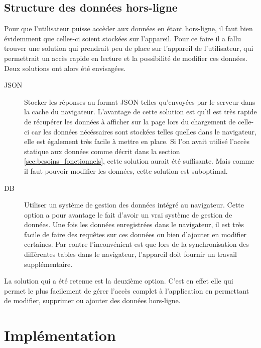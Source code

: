 \documentclass{EPL-master-thesis-covers-FR}
\begin{document}
		\section{Structure des données hors-ligne}
			\label{sec:data}
			Pour que l'utilisateur puisse accèder aux données en étant hors-ligne, il faut bien évidemment que celles-ci soient stockées sur l'appareil. Pour ce faire il a fallu trouver une solution qui prendrait peu de place sur l'appareil de l'utilisateur, qui permettrait un accès rapide en lecture et la possibilité de modifier ces données. Deux solutions ont alors été envisagées.
			\begin{description}
				\item[JSON] Stocker les réponses au format JSON telles qu'envoyées par le serveur dans la cache du navigateur. L'avantage de cette solution est qu'il est très rapide de récupérer les données à afficher sur la page lors du chargement de celle-ci car les données nécéssaires sont stockées telles quelles dans le navigateur, elle est également très facile à mettre en place. Si l'on avait utilisé l'accès statique aux données comme décrit dans la section \ref{sec:besoins_fonctionnels}, cette solution aurait été suffisante. Mais comme il faut pouvoir modifier les données, cette solution est suboptimal.
				\item[DB] Utiliser un système de gestion des données intégré au navigateur. Cette option a pour avantage le fait d'avoir un vrai système de gestion de données. Une fois les données enregistrées dans le navigateur, il est très facile de faire des requêtes sur ces données ou bien d'ajouter en modifier certaines. Par contre l'inconvénient est que lors de la synchronisation des différentes tables dans le navigateur, l'appareil doit fournir un travail supplémentaire.
			\end{description}
				
			La solution qui a été retenue est la deuxième option. C'est en effet elle qui permet le plus facilement de gérer l'accès complet à l'application en permettant de modifier, supprimer ou ajouter des données hors-ligne.





	\chapter{Implémentation}
\end{document}
